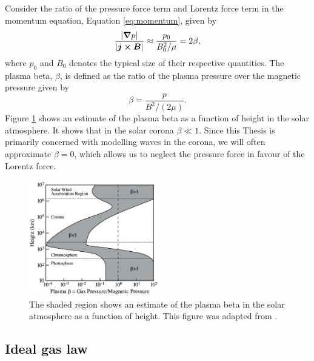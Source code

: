 
Consider the ratio of the pressure force term and Lorentz force term in the momentum equation, Equation \eqref{eq:momentum}, given by
\[\frac{|\grad p|}{|\boldsymbol{j}\cross\boldsymbol{B}|}\approx \frac{p_0}{B_0^2/\mu}=2\beta,\]
where $p_0$ and $B_0$ denotes the typical size of their respective quantities. The plasma beta, $\beta$, is defined as the ratio of the plasma pressure over the magnetic pressure given by
\begin{equation}
    \label{eq:plasma_beta}
    \beta = \frac{p}{B^2/(2\mu)}.
\end{equation}
Figure \ref{fig:plasma_beta} shows an estimate of the plasma beta as a function of height in the solar atmosphere. It shows that in the solar corona $\beta \ll 1$. Since this Thesis is primarily concerned with modelling waves in the corona, we will often approximate $\beta=0$, which allows us to neglect the pressure force in favour of the Lorentz force.

\begin{figure}
    \centering
    \includegraphics[width = 0.5\textwidth]{figures/introduction/plasma_beta.jpg}
    \caption{The shaded region shows an estimate of the plasma beta in the solar atmosphere as a function of height. This figure was adapted from \citet{Gary2001}.}
    \label{fig:plasma_beta}
\end{figure}

\subsection{Ideal gas law}

